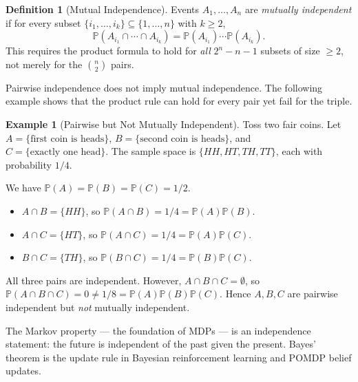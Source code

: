 \documentclass[11pt,a4paper]{article}
\theoremstyle{definition}
\newtheorem{definition}{Definition}[section]
\newtheorem{example}{Example}[section]
\theoremstyle{plain}
\theoremstyle{remark}
\newcommand{\Prob}{\mathbb{P}}
\begin{document}
\begin{definition}[Mutual Independence]
\label{def:mutual_indep}
Events $A_1, \ldots, A_n$ are \emph{mutually independent} if for every subset
$\{i_1, \ldots, i_k\} \subseteq \{1, \ldots, n\}$ with $k \geq 2$,
\[
    \Prob(A_{i_1} \cap \cdots \cap A_{i_k}) = \Prob(A_{i_1}) \cdots \Prob(A_{i_k}).
\]
This requires the product formula to hold for \emph{all} $2^n - n - 1$ subsets of size
$\geq 2$, not merely for the $\binom{n}{2}$ pairs.
\end{definition}

\begin{warning}
Pairwise independence does not imply mutual independence. The following example shows that
the product rule can hold for every pair yet fail for the triple.
\end{warning}

\begin{example}[Pairwise but Not Mutually Independent]
\label{ex:pairwise_not_mutual}
Toss two fair coins. Let $A = \{\text{first coin is heads}\}$,
$B = \{\text{second coin is heads}\}$, and $C = \{\text{exactly one head}\}$.
The sample space is $\{HH, HT, TH, TT\}$, each with probability $1/4$.

We have $\Prob(A) = \Prob(B) = \Prob(C) = 1/2$.
\begin{itemize}[nosep]
    \item $A \cap B = \{HH\}$, so $\Prob(A \cap B) = 1/4 = \Prob(A)\Prob(B)$.
    \item $A \cap C = \{HT\}$, so $\Prob(A \cap C) = 1/4 = \Prob(A)\Prob(C)$.
    \item $B \cap C = \{TH\}$, so $\Prob(B \cap C) = 1/4 = \Prob(B)\Prob(C)$.
\end{itemize}
All three pairs are independent. However, $A \cap B \cap C = \emptyset$, so
$\Prob(A \cap B \cap C) = 0 \neq 1/8 = \Prob(A)\Prob(B)\Prob(C)$.
Hence $A, B, C$ are pairwise independent but \emph{not} mutually independent.
\end{example}

\begin{rlconnection}[Connection to RL]
The Markov property --- the foundation of MDPs --- is an independence statement: the future
is independent of the past given the present. Bayes' theorem is the update rule in Bayesian
reinforcement learning and POMDP belief updates.
\end{rlconnection}

\end{document}
